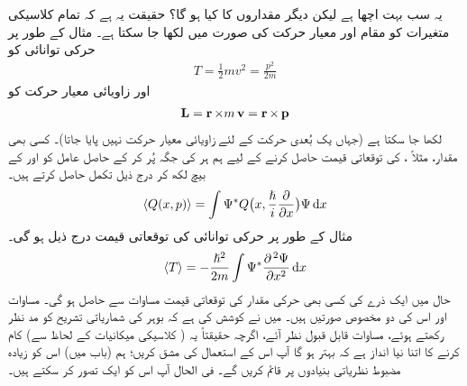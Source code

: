 یہ سب بہت اچھا ہے لیکن دیگر مقداروں کا کیا ہو گا؟ حقیقت یہ ہے کہ تمام کلاسیکی متغیرات کو مقام اور معیار حرکت کی صورت میں لکھا جا سکتا ہے۔ مثال کے طور پر حرکی توانائی کو
\begin{align*}
T=\frac{1}{2}mv^{2}=\frac{p^{2}}{2m}
\end{align*}
اور زاویائی معیار حرکت کو 
\begin{align*}
\operatorname{\mathbf{L}}=\operatorname{\mathbf{r}}\times m\operatorname{\mathbf{v}}=\operatorname{\mathbf{r}}\times \operatorname{\mathbf{p}}
\end{align*}
لکھا جا سکتا ہے (جہاں یک بُعدی حرکت کے لئے زاویائی معیار حرکت نہیں پایا جاتا)۔ کسی بھی مقدار، مثلاً ، کی توقعاتی قیمت حاصل کرنے کے لیے ہم ہر  کی جگہ  پُر کر کے حاصل عامل کو  اور  کے بیچ لکھ کر درج ذیل تکمل حاصل کرتے ہیں۔
\begin{align}\label{مساوات_تفاعل_موج_توقعاتی_قیمت_حصول}
\langle Q(x,p) \rangle=\int \Psi^*Q\big (x,\frac{\hslash}{i}\frac{\partial}{\partial{x}}\big )\Psi \dif{x}
\end{align}
مثال کے طور پر حرکی توانائی کی توقعاتی قیمت درج ذیل ہو گی۔
\begin{align}
\langle T \rangle=-\frac{\hslash ^{2}}{2m}\int \Psi^*\frac{\partial^{\,2}\Psi}{\partial{x^{2}}}\dif{x}
\end{align}
حال  میں ایک ذرے کی کسی بھی حرکی مقدار کی توقعاتی قیمت مساوات  سے حاصل ہو گی۔ 
مساوات  اور  اس کی دو مخصوص صورتیں ہیں۔ میں نے کوشش کی ہے کہ بوہر کی شماریاتی تشریح کو مد نظر رکھتے ہوئے، مساوات  قابل قبول نظر آئے، اگرچہ حقیقتاً یہ ( کلاسیکی میکانیات کے لحاظ سے) کام کرنے کا اتنا نیا انداز ہے کہ بہتر ہو گا آپ اس کے استعمال کی مشق کریں؛ ہم (باب  میں) اس کو زیادہ مضبوط نظریاتی بنیادوں پر قائم کریں گے۔ فی الحال آپ اس کو ایک  تصور کر سکتے ہیں۔


